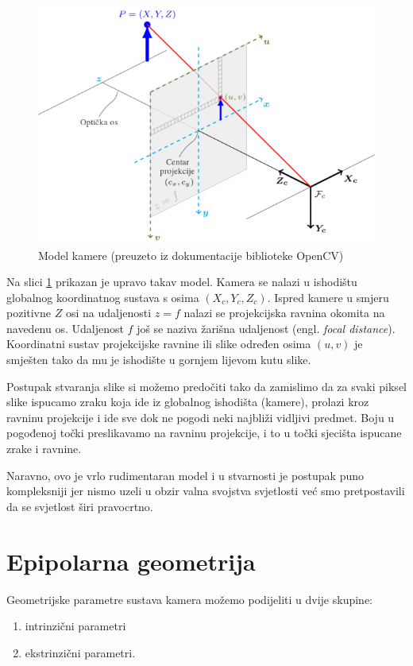 \documentclass[utf8, zavrsni, numeric]{fer}
\begin{document}
\begin{figure}[htb]
  \centering
  \includegraphics[width=13cm]{img/pinhole_camera_model.png}
  \caption{Model kamere (preuzeto iz dokumentacije biblioteke OpenCV)}
  \label{fig:model-kamere}
\end{figure}

Na slici \ref{fig:model-kamere} prikazan je upravo takav model. Kamera se nalazi u ishodištu
globalnog koordinatnog sustava s osima $(X_c, Y_c, Z_c)$. Ispred kamere u smjeru pozitivne
$Z$ osi na udaljenosti $z = f$ nalazi se projekcijska ravnina okomita na navedenu os. Udaljenost $f$ još se naziva žarišna udaljenost (engl. {\sl focal distance}). Koordinatni sustav projekcijske ravnine
ili slike određen osima $(u, v)$ je smješten tako da mu je ishodište u gornjem lijevom kutu slike.

Postupak stvaranja slike si možemo predočiti tako da zamislimo da za svaki piksel slike ispucamo
zraku koja ide iz globalnog ishodišta (kamere), prolazi kroz ravninu projekcije i ide sve dok ne pogodi neki najbliži vidljivi predmet. Boju u pogođenoj točki preslikavamo na ravninu projekcije, i to u točki sjecišta ispucane zrake i ravnine.

Naravno, ovo je vrlo rudimentaran model i u stvarnosti je postupak puno kompleksniji jer nismo
uzeli u obzir valna svojstva svjetlosti već smo pretpostavili da se svjetlost širi pravocrtno.

\section{Epipolarna geometrija}

Geometrijske parametre sustava kamera možemo podijeliti u dvije skupine:
\begin{enumerate}
  \item intrinzični parametri
  \item ekstrinzični parametri.
\end{enumerate}
\end{document}
